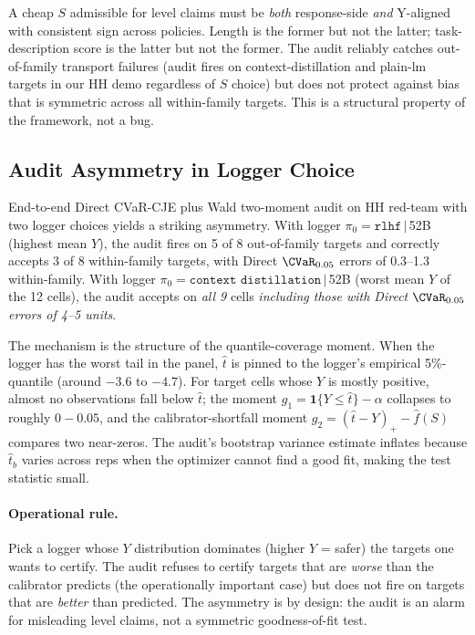 A cheap \(S\) admissible for level claims must be \emph{both}
response-side \emph{and} Y-aligned with consistent sign across
policies. Length is the former but not the latter; task-description
score is the latter but not the former. The audit reliably catches
out-of-family transport failures (audit fires on context-distillation
and plain-lm targets in our HH demo regardless of \(S\) choice) but
does not protect against bias that is symmetric across all
within-family targets. This is a structural property of the framework,
not a bug.

\subsection{Audit Asymmetry in Logger Choice}
\label{app:dataset:asymmetry}

End-to-end Direct CVaR-CJE plus Wald two-moment audit on HH red-team
with two logger choices yields a striking asymmetry. With logger
\(\pi_0 = \texttt{rlhf}\,|\,\)52B (highest mean \(Y\)), the audit fires
on 5 of 8 out-of-family targets and correctly accepts 3 of 8
within-family targets, with Direct \(\CVaR_{0.05}\) errors of 0.3--1.3
within-family. With logger \(\pi_0 = \texttt{context distillation}\,|
\,\)52B (worst mean \(Y\) of the 12 cells), the audit accepts on
\emph{all 9} cells \emph{including those with Direct
\(\CVaR_{0.05}\) errors of 4--5 units}.

The mechanism is the structure of the quantile-coverage moment.
When the logger has the worst tail in the panel, \(\hat t\) is
pinned to the logger's empirical 5\%-quantile (around \(-3.6\) to
\(-4.7\)). For target cells whose \(Y\) is mostly positive, almost
no observations fall below \(\hat t\); the moment
\(g_1 = \mathbf{1}\{Y \le \hat t\} - \alpha\) collapses to roughly
\(0 - 0.05\), and the calibrator-shortfall moment
\(g_2 = (\hat t - Y)_+ - \hat f(S)\) compares two near-zeros. The
audit's bootstrap variance estimate inflates because \(\hat t_b\)
varies across reps when the optimizer cannot find a good fit, making
the test statistic small.

\paragraph{Operational rule.} Pick a logger whose \(Y\) distribution
dominates (higher \(Y\) = safer) the targets one wants to certify.
The audit refuses to certify targets that are \emph{worse} than the
calibrator predicts (the operationally important case) but does not
fire on targets that are \emph{better} than predicted. The asymmetry
is by design: the audit is an alarm for misleading level claims, not
a symmetric goodness-of-fit test.


